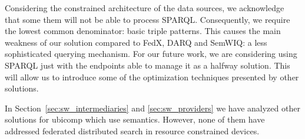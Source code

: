Considering the constrained architecture of the data sources, we acknowledge that some them will not be able to process SPARQL.
Consequently, we require the lowest common denominator: basic triple patterns.
This causes the main weakness of our solution compared to FedX, DARQ and SemWIQ: a less sophisticated querying mechanism.
For our future work, we are considering using SPARQL just with the endpoints able to manage it as a halfway solution.
This will allow us to introduce some of the optimization techniques presented by other solutions.


\bigskip


In Section~\ref{sec:sw_intermediaries} and \ref{sec:sw_providers} we have analyzed other solutions for \ac{ubicomp} which use semantics.
However, none of them have addressed federated distributed search in resource constrained devices.













